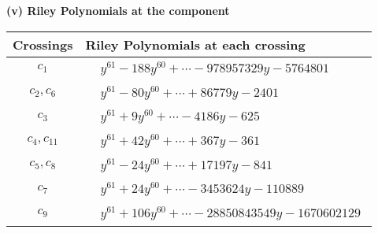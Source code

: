 \documentclass[1p]{elsarticle_modified}
\theoremstyle{definition}
\begin{document}
\newpage\renewcommand{\arraystretch}{1}
\flushleft \textbf{(v) Riley Polynomials at the component}\newline \\
\begin{tabular}{m{50pt}|m{274pt}}
Crossings & \hspace{64pt}Riley Polynomials at each crossing \\
\hline $$\begin{aligned}c_{1}\end{aligned}$$&$\begin{aligned}
&y^{61}-188 y^{60}+\cdots-978957329 y-5764801
\end{aligned}$\\
\hline $$\begin{aligned}c_{2},c_{6}\end{aligned}$$&$\begin{aligned}
&y^{61}-80 y^{60}+\cdots+86779 y-2401
\end{aligned}$\\
\hline $$\begin{aligned}c_{3}\end{aligned}$$&$\begin{aligned}
&y^{61}+9 y^{60}+\cdots-4186 y-625
\end{aligned}$\\
\hline $$\begin{aligned}c_{4},c_{11}\end{aligned}$$&$\begin{aligned}
&y^{61}+42 y^{60}+\cdots+367 y-361
\end{aligned}$\\
\hline $$\begin{aligned}c_{5},c_{8}\end{aligned}$$&$\begin{aligned}
&y^{61}-24 y^{60}+\cdots+17197 y-841
\end{aligned}$\\
\hline $$\begin{aligned}c_{7}\end{aligned}$$&$\begin{aligned}
&y^{61}+24 y^{60}+\cdots-3453624 y-110889
\end{aligned}$\\
\hline $$\begin{aligned}c_{9}\end{aligned}$$&$\begin{aligned}
&y^{61}+106 y^{60}+\cdots-28850843549 y-1670602129
\end{aligned}$\\

\end{tabular}
\end{document}
